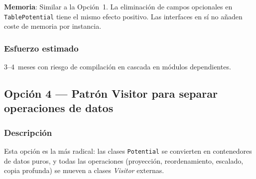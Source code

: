 \documentclass[11pt,a4paper]{article}
\newcommand{\code}[1]{\texttt{#1}}
\begin{document}
\textbf{Memoria}: Similar a la Opción~1.  La eliminación de campos opcionales
en \code{TablePotential} tiene el mismo efecto positivo.  Las interfaces en sí
no añaden coste de memoria por instancia.

\subsubsection*{Esfuerzo estimado}

3--4~meses con riesgo de compilación en cascada en módulos dependientes.

\subsection{Opción 4 --- Patrón Visitor para separar operaciones de datos}
\label{sec:op4}

\subsubsection*{Descripción}

Esta opción es la más radical: las clases \code{Potential} se convierten en
contenedores de datos puros, y todas las operaciones (proyección, reordenamiento,
escalado, copia profunda) se mueven a clases \emph{Visitor} externas.
\end{document}
